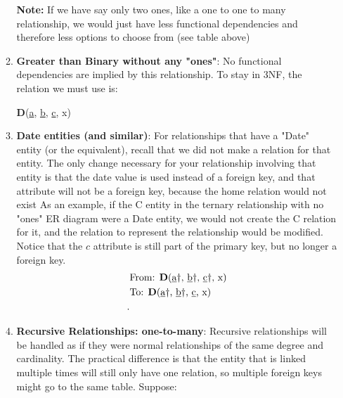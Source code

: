 \documentclass{report}
\begin{document}
\begin{itemize}
\begin{enumerate}
\begin{table}[h!]
\begin{tabular}{ll}
                            \bottomrule
                        \end{tabular}
                    \end{table}
                    \textbf{Note:} If we have say only two ones, like a one to one to many relationship, we would just have less functional dependencies and therefore less options to choose from (see table above)
                \item \textbf{Greater than Binary without any "ones"}:
                    No functional dependencies are implied by this relationship. To stay in 3NF, the relation we must use is:
                    \begin{center}
                        \textbf{D}(\underline{a}\dag, \underline{b}\dag, \underline{c}\dag, x)
                    \end{center}
                \item \textbf{Date entities (and similar)}: For relationships that have a "Date" entity (or the equivalent), recall that we did not make a relation for that entity. The only change necessary for your relationship involving that entity is that the date value is used instead of a foreign key, and that attribute will not be a foreign key, because the home relation would not exist
                    \bigbreak \noindent 
                    As an example, if the C entity in the ternary relationship with no "ones" ER diagram were a Date entity, we would not create the C relation for it, and the relation to represent the relationship would be modified. Notice that the $c$ attribute is still part of the primary key, but no longer a foreign key.
                    \begin{align*}
                        &\text{From: \textbf{D}(\underline{a}\dag, \underline{b}\dag, \underline{c}\dag, x)} \\
                        &\text{To: \textbf{D}(\underline{a}\dag, \underline{b}\dag, \underline{c}, x)} \\
                   .\end{align*}
                \item \textbf{Recursive Relationships: one-to-many}: Recursive relationships will be handled as if they were normal relationships of the same degree and cardinality. The practical difference is that the entity that is linked multiple times will still only have one relation, so multiple foreign keys might go to the same table.
                    \bigbreak \noindent 
                    Suppose: 
                    \bigbreak \noindent 

\end{enumerate}
\end{itemize}
\end{document}
